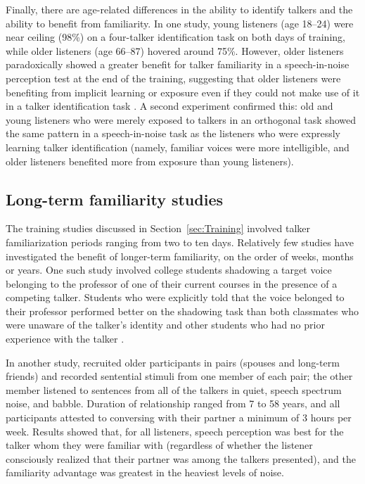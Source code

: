 
Finally, there are age-related differences in the ability to identify talkers and the ability to benefit from familiarity.  In one study, young listeners (age 18–24) were near ceiling (98\%) on a four-talker identification task on both days of training, while older listeners (age 66–87) hovered around 75\%.  However, older listeners paradoxically showed a greater benefit for talker familiarity in a speech-in-noise perception test at the end of the training, suggesting that older listeners were benefiting from implicit learning or exposure even if they could not make use of it in a talker identification task \citep{YonanSommers2000}.  A second experiment confirmed this: old and young listeners who were merely exposed to talkers in an orthogonal task showed the same pattern in a speech-in-noise task as the listeners who were expressly learning talker identification (namely, familiar voices were more intelligible, and older listeners benefited more from exposure than young listeners).

\subsection{Long-term familiarity studies\label{sec:LongTerm}}
The training studies discussed in Section~\ref{sec:Training} involved talker familiarization periods ranging from two to ten days.  Relatively few studies have investigated the benefit of longer-term familiarity, on the order of weeks, months or years.  One such study involved college students shadowing a target voice belonging to the professor of one of their current courses in the presence of a competing talker.  Students who were explicitly told that the voice belonged to their professor performed better on the shadowing task than both classmates who were unaware of the talker’s identity and other students who had no prior experience with the talker \citep{NewmanEvers2007}.  

In another study, \citet{SouzaEtAl2013} recruited older participants in pairs (spouses and long-term friends) and recorded sentential stimuli from one member of each pair; the other member listened to sentences from all of the talkers in quiet, speech spectrum noise, and babble.  Duration of relationship ranged from 7 to 58 years, and all participants attested to conversing with their partner a minimum of 3 hours per week.  Results showed that, for all listeners, speech perception was best for the talker whom they were familiar with (regardless of whether the listener consciously realized that their partner was among the talkers presented), and the familiarity advantage was greatest in the heaviest levels of noise.

